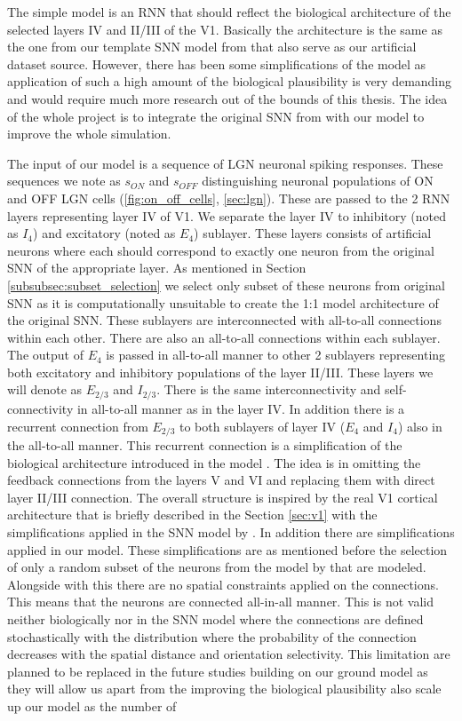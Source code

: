 The simple model is an RNN that should reflect the biological architecture of the selected layers IV and II/III of the V1. Basically the architecture is the same as the one from our template SNN model from \citet{antolik2024comprehensive} that also serve as our artificial dataset source. However, there has been some simplifications of the model as application of such a high amount of the biological plausibility is very demanding and would require much more research out of the bounds of this thesis. The idea of the whole project is to integrate the original SNN from \citet{antolik2024comprehensive} with our model to improve the whole simulation.

The input of our model is a sequence of LGN neuronal spiking responses. These sequences we note as $s_{ON}$ and $s_{OFF}$ distinguishing neuronal populations of ON and OFF LGN cells (\ref{fig:on_off_cells}, \ref{sec:lgn}). These are passed to the 2 RNN layers representing layer IV of V1. We separate the layer IV to inhibitory (noted as $I_4$) and excitatory (noted as $E_4$) sublayer. These layers consists of artificial neurons where each should correspond to exactly one neuron from the original SNN of the appropriate layer. As mentioned in Section \ref{subsubsec:subset_selection} we select only subset of these neurons from original SNN as it is computationally unsuitable to create the 1:1 model architecture of the original SNN. These sublayers are interconnected with all-to-all connections within each other. There are also an all-to-all connections within each sublayer. The output of $E_4$ is passed in all-to-all manner to other 2 sublayers representing both excitatory and inhibitory populations of the layer II/III. These layers we will denote as $E_{2/3}$ and $I_{2/3}$. There is the same interconnectivity and self-connectivity in all-to-all manner as in the layer IV. In addition there is a recurrent connection from $E_{2/3}$ to both sublayers of layer IV ($E_4$ and $I_4$) also in the all-to-all manner. This recurrent connection is a simplification of the biological architecture introduced in the model \citet{antolik2024comprehensive}. The idea is in omitting the feedback connections from the layers V and VI and replacing them with direct layer II/III connection. The overall structure is inspired by the real V1 cortical architecture that is briefly described in the Section \ref{sec:v1} with the simplifications applied in the SNN model by \citet{antolik2024comprehensive}. In addition there are simplifications applied in our model. These simplifications are as mentioned before the selection of only a random subset of the neurons from the model by \citet{antolik2024comprehensive} that are modeled. Alongside with this there are no spatial constraints applied on the connections. This means that the neurons are connected all-in-all manner. This is not valid neither biologically nor in the SNN model where the connections are defined stochastically with the distribution where the probability of the connection decreases with the spatial distance and orientation selectivity. This limitation are planned to be replaced in the future studies building on our ground model as they will allow us apart from the improving the biological plausibility also scale up our model as the number of 